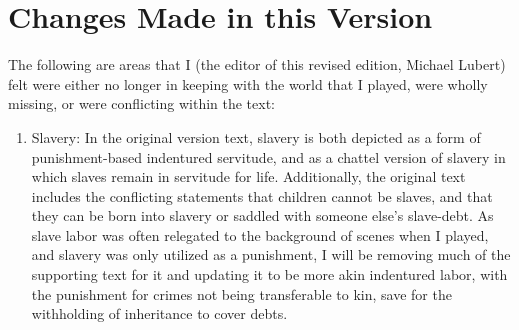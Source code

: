 \chapter{Changes Made in this Version}
The following are areas that I (the editor of this revised edition, Michael Lubert) felt were either no longer in keeping with the world that I played, were wholly missing, or were conflicting within the text:
\begin{enumerate}[leftmargin=12pt]
\item Slavery: In the original version text, slavery is both depicted as a form of punishment-based indentured servitude, and as a chattel version of slavery in which slaves remain in servitude for life. Additionally, the original text includes the conflicting statements that children cannot be slaves, and that they can be born into slavery or saddled with someone else's slave-debt. As slave labor was often relegated to the background of scenes when I played, and slavery was only utilized as a punishment, I will be removing much of the supporting text for it and updating it to be more akin indentured labor, with the punishment for crimes not being transferable to kin, save for the withholding of inheritance to cover debts. 


\end{enumerate}
